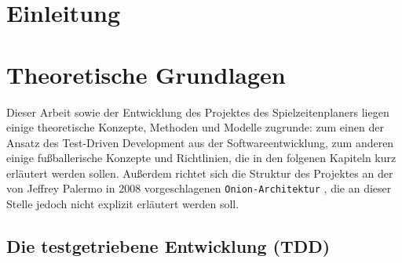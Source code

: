 %
%





\section{Einleitung}



\pagebreak


\section{Theoretische Grundlagen}

Dieser Arbeit sowie der Entwicklung des Projektes des Spielzeitenplaners liegen 
einige theoretische Konzepte, Methoden und Modelle zugrunde: zum einen der Ansatz des 
Test-Driven Development aus der Softwareentwicklung, zum anderen einige fußballerische 
Konzepte und Richtlinien, die in den folgenen Kapiteln kurz erläutert werden sollen. 
Außerdem richtet sich die Struktur des Projektes an der von Jeffrey Palermo in 2008 
vorgeschlagenen \texttt{Onion-Architektur} \cite{palermo2008onion}, die an dieser 
Stelle jedoch nicht explizit erläutert werden soll. 


\subsection{Die testgetriebene Entwicklung (TDD)}




